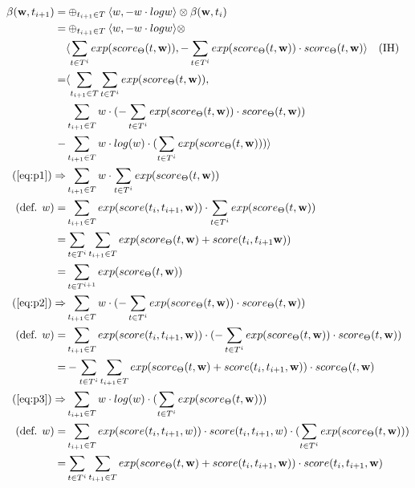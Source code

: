 \documentclass[a4paper,12pt]{ETHexercise}
\begin{document}
\begin{align}
    \beta(\textbf{w}, t_{i+1}) = &\oplus_{t_{i+1} \in T} \langle w, -w \cdot logw\rangle \otimes \beta(\textbf{w}, t_i)\\
    = &\oplus_{t_{i+1} \in T} \langle w, -w \cdot logw\rangle \otimes \\ 
    &\langle\sum_{t \in T^i} exp(score_\Theta(t,\textbf{w})), -\sum_{t \in T^i} exp(score_\Theta(t,\textbf{w})) \cdot score_\Theta(t,\textbf{w})\rangle \quad (\text{IH})\\
    = &\langle  \sum_{t_{i+1}\in T}\sum_{t \in T^i} exp(score_\Theta(t,\textbf{w}))  , \label{eq:p1}\\ 
    &\sum_{t_{i+1}\in T} w \cdot (-\sum_{t \in T^i} exp(score_\Theta(t,\textbf{w})) \cdot score_\Theta(t,\textbf{w})) \label{eq:p2}\\
    -&\sum_{t_{i+1}\in T} w \cdot log(w) \cdot (\sum_{t \in T^i} exp(score_\Theta(t,\textbf{w}))) \rangle \label{eq:p3}\\
    (\ref{eq:p1}) \Rightarrow &\sum_{t_{i+1}\in T} w \cdot \sum_{t \in T^i} exp(score_\Theta(t,\textbf{w}))\\
    (\text{def. }w)= &\sum_{t_{i+1}\in T} exp(score(t_{i}, t_{i+1}, \textbf{w})) \cdot \sum_{t \in T^i} exp(score_\Theta(t,\textbf{w}))\\
    = &\sum_{t \in T^i} \sum_{t_{i+1}\in T} exp(score_\Theta(t,\textbf{w}) + score(t_{i}, t_{i+1} \textbf{w}))\\
    = &\sum_{t \in T^{i+1}} exp(score_\Theta(t,\textbf{w})) \label{eq:p1r}\\
    (\ref{eq:p2}) \Rightarrow & \sum_{t_{i+1}\in T} w \cdot (-\sum_{t \in T^i} exp(score_\Theta(t,\textbf{w})) \cdot score_\Theta(t,\textbf{w}))\\
    (\text{def. }w)= &\sum_{t_{i+1}\in T} exp(score(t_{i}, t_{i+1}, \textbf{w})) \cdot (-\sum_{t \in T^i} exp(score_\Theta(t,\textbf{w})) \cdot score_\Theta(t,\textbf{w}))\\
    = &-\sum_{t \in T^i}\sum_{t_{i+1}\in T} exp(score_\Theta(t,\textbf{w}) + score(t_{i}, t_{i+1}, \textbf{w})) \cdot score_\Theta(t,\textbf{w}) \label{eq:p2r}\\
    (\ref{eq:p3}) \Rightarrow &\sum_{t_{i+1}\in T} w \cdot log(w) \cdot (\sum_{t \in T^i} exp(score_\Theta(t,\textbf{w})))\\
    (\text{def. }w)= &\sum_{t_{i+1}\in T} exp(score(t_{i}, t_{i+1}, w)) \cdot score(t_{i}, t_{i+1},w) \cdot (\sum_{t \in T^i} exp(score_\Theta(t,\textbf{w})))\\
    = &\sum_{t \in T^i} \sum_{t_{i+1}\in T} exp(score_\Theta(t,\textbf{w}) + score(t_{i}, t_{i+1}, \textbf{w})) \cdot score(t_{i}, t_{i+1}, \textbf{w}) \label{eq:p3r}
\end{align}
\end{document}
